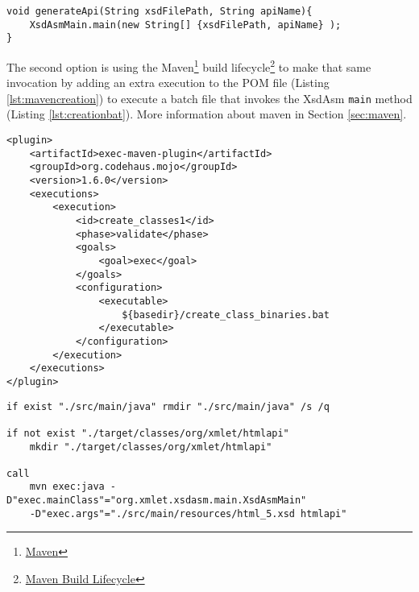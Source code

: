 \begin{minipage}{\linewidth}
\begin{lstlisting}[caption={API creation},label={lst:directapicreation}]
void generateApi(String xsdFilePath, String apiName){
    XsdAsmMain.main(new String[] {xsdFilePath, apiName} );    
}
\end{lstlisting}
\end{minipage}

\noindent
The second option is using the Maven\footnote{\href{https://maven.apache.org/}{Maven}} build lifecycle\footnote{\href{https://maven.apache.org/guides/introduction/introduction-to-the-lifecycle.html\#Build_Lifecycle_Basics}{Maven Build Lifecycle}} to make that same invocation by adding an extra execution to the \ac{POM} file (Listing \ref{lst:mavencreation}) to execute a batch file that invokes the XsdAsm \texttt{main} method (Listing \ref{lst:creationbat}). More information about maven in Section \ref{sec:maven}.

\bigskip


\begin{minipage}{\linewidth}
\begin{lstlisting}[caption={Maven API compile classes plugin},label={lst:mavencreation}]
<plugin>
    <artifactId>exec-maven-plugin</artifactId>
    <groupId>org.codehaus.mojo</groupId>
    <version>1.6.0</version>
    <executions>
        <execution>
            <id>create_classes1</id>
            <phase>validate</phase>
            <goals>
                <goal>exec</goal>
            </goals>
            <configuration>
                <executable>
                    ${basedir}/create_class_binaries.bat
                </executable>
            </configuration>
        </execution>
    </executions>
</plugin>
\end{lstlisting}
\end{minipage}


\begin{minipage}{\linewidth}
\begin{lstlisting}[caption={Maven API creation batch file (create\_class\_binaries.bat)},label={lst:creationbat}]
if exist "./src/main/java" rmdir "./src/main/java" /s /q

if not exist "./target/classes/org/xmlet/htmlapi" 
    mkdir "./target/classes/org/xmlet/htmlapi"

call 
    mvn exec:java -D"exec.mainClass"="org.xmlet.xsdasm.main.XsdAsmMain" 
    -D"exec.args"="./src/main/resources/html_5.xsd htmlapi"
\end{lstlisting}
\end{minipage}

